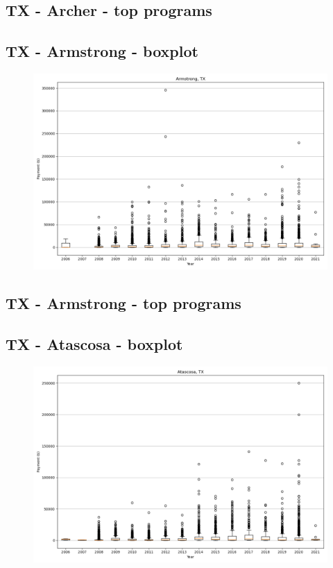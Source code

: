 \subsection*{TX - Archer - top programs}

\newpage
\subsection*{TX - Armstrong - boxplot}
\begin{figure}[h]
\centering
\includegraphics[width=7in]{../output/boxplots/counties/Armstrong-TX_boxplot.png}
\end{figure}


\subsection*{TX - Armstrong - top programs}

\newpage
\subsection*{TX - Atascosa - boxplot}
\begin{figure}[h]
\centering
\includegraphics[width=7in]{../output/boxplots/counties/Atascosa-TX_boxplot.png}
\end{figure}


